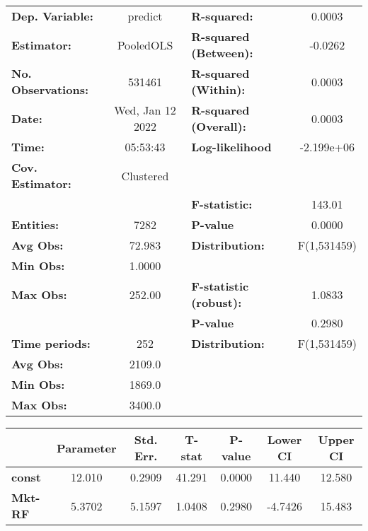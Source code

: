 \begin{center}
\begin{tabular}{lclc}
\toprule
\textbf{Dep. Variable:}    &      predict       & \textbf{  R-squared:         }   &      0.0003      \\
\textbf{Estimator:}        &     PooledOLS      & \textbf{  R-squared (Between):}  &     -0.0262      \\
\textbf{No. Observations:} &       531461       & \textbf{  R-squared (Within):}   &      0.0003      \\
\textbf{Date:}             &  Wed, Jan 12 2022  & \textbf{  R-squared (Overall):}  &      0.0003      \\
\textbf{Time:}             &      05:53:43      & \textbf{  Log-likelihood     }   &    -2.199e+06    \\
\textbf{Cov. Estimator:}   &     Clustered      & \textbf{                     }   &                  \\
\textbf{}                  &                    & \textbf{  F-statistic:       }   &      143.01      \\
\textbf{Entities:}         &        7282        & \textbf{  P-value            }   &      0.0000      \\
\textbf{Avg Obs:}          &       72.983       & \textbf{  Distribution:      }   &   F(1,531459)    \\
\textbf{Min Obs:}          &       1.0000       & \textbf{                     }   &                  \\
\textbf{Max Obs:}          &       252.00       & \textbf{  F-statistic (robust):} &      1.0833      \\
\textbf{}                  &                    & \textbf{  P-value            }   &      0.2980      \\
\textbf{Time periods:}     &        252         & \textbf{  Distribution:      }   &   F(1,531459)    \\
\textbf{Avg Obs:}          &       2109.0       & \textbf{                     }   &                  \\
\textbf{Min Obs:}          &       1869.0       & \textbf{                     }   &                  \\
\textbf{Max Obs:}          &       3400.0       & \textbf{                     }   &                  \\
\bottomrule
\end{tabular}
\begin{tabular}{lcccccc}
                & \textbf{Parameter} & \textbf{Std. Err.} & \textbf{T-stat} & \textbf{P-value} & \textbf{Lower CI} & \textbf{Upper CI}  \\
\midrule
\textbf{const}  &       12.010       &       0.2909       &      41.291     &      0.0000      &       11.440      &       12.580       \\
\textbf{Mkt-RF} &       5.3702       &       5.1597       &      1.0408     &      0.2980      &      -4.7426      &       15.483       \\
\bottomrule
\end{tabular}
\end{center}
